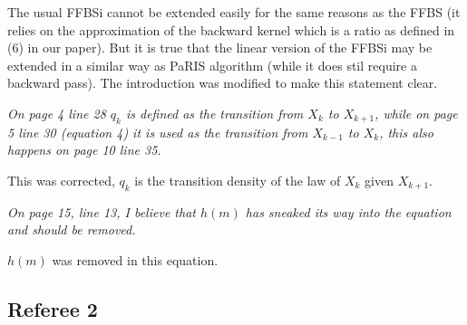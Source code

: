\documentclass[12pt]{article}
\newcommand{\1}{\mathrm{1}}
\begin{document}
\vspace{.3cm}

The usual FFBSi cannot be extended easily for the same reasons as the FFBS (it relies on the approximation of the backward kernel which is a ratio as defined in (6) in our paper). But it is true that the linear version of the FFBSi may be extended in a similar way as PaRIS algorithm (while it does stil require a backward pass). The introduction was modified to make this statement clear.

\vspace{1cm}

{\em On page 4 line 28 $q_k$ is defined as the transition from $X_k$ to $X_{k+1}$, while on page 5 line 30 (equation
4) it is used as the transition from $X_{k-1}$ to $X_k$, this also happens on page 10 line 35.}

\vspace{.3cm}

This was corrected, $q_k$ is the transition density of the law of $X_k$ given $X_{k+1}$.

\vspace{1cm}

{\em On page 15, line 13, I believe that $h(m)$ has sneaked its way into the equation and should be removed.}

\vspace{.3cm}
 $h(m)$ was removed in this equation. 

\subsection*{Referee 2}
\end{document}

